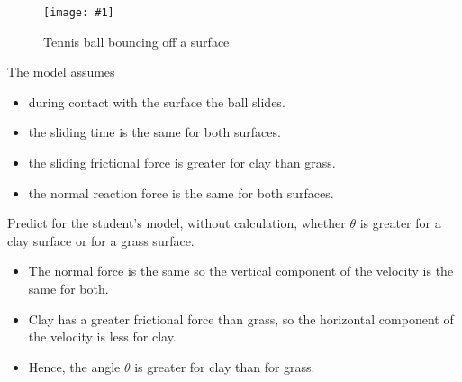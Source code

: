 \documentclass[a4paper,12pt]{article}
\newcommand{\img}[4]{\begin{center}
  \begin{figure}[H]
    \centering
    \texttt{[image: \#1]}
    \caption{#3}
    \label{fig:#4}
  \end{figure}
\end{center}}
\begin{document}
\begin{enumerate}[label=(\alph*)]
        \img{ex/5.png}{0.9}{Tennis ball bouncing off a surface}{tennisballbounce}
        The model assumes
        \begin{itemize}
          \item during contact with the surface the ball slides.
          \item the sliding time is the same for both surfaces.
          \item the sliding frictional force is greater for clay than grass.
          \item the normal reaction force is the same for both surfaces.
        \end{itemize}
        Predict for the student's model, without calculation, whether $\theta$ is greater for a clay surface or for a grass surface.
        \begin{itemize}
          \item The normal force is the same so the vertical component of the velocity is the same for both.
          \item Clay has a greater frictional force than grass, so the horizontal component of the velocity is less for clay.
          \item Hence, the angle $\theta$ is greater for clay than for grass.
        \end{itemize}
\end{enumerate}
\end{document}
